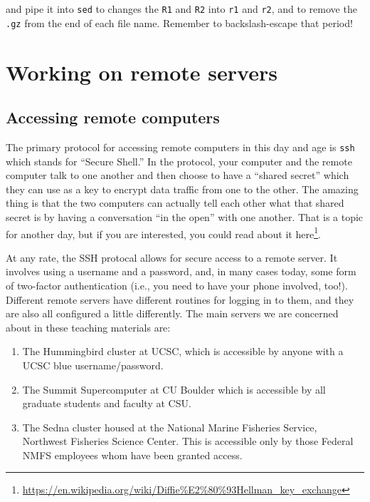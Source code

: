 \documentclass[]{krantz}
\providecommand{\tightlist}{%
  \setlength{\itemsep}{0pt}\setlength{\parskip}{0pt}}
\renewcommand{\href}[2]{#2\footnote{\url{#1}}}
\begin{document}
and pipe it into \texttt{sed} to changes the \texttt{R1} and \texttt{R2} into \texttt{r1} and \texttt{r2},
and to remove the \texttt{.gz} from the end of each file name. Remember to
backslash-escape that period!

\hypertarget{working-on-remote-servers}{%
\chapter{Working on remote servers}\label{working-on-remote-servers}}

\hypertarget{accessing-remote-computers}{%
\section{Accessing remote computers}\label{accessing-remote-computers}}

The primary protocol for accessing remote computers in this day and age
is \texttt{ssh} which stands for ``Secure Shell.'' In the protocol, your computer
and the remote computer talk to one another and then choose to have a ``shared
secret'' which they can use as a key to encrypt data traffic from one to the other.
The amazing thing is that the two computers can actually tell each other what
that shared secret is by having a conversation ``in the open'' with one another.
That is a topic for another day, but if you are interested, you could
read about it \href{https://en.wikipedia.org/wiki/Diffie\%E2\%80\%93Hellman_key_exchange}{here}.

At any rate, the SSH protocal allows for secure access to a remote server. It involves
using a username and a password, and, in many cases today, some form of two-factor
authentication (i.e., you need to have your phone involved, too!). Different
remote servers have different routines for logging in to them, and they are also
all configured a little differently. The main servers we are concerned about in
these teaching materials are:

\begin{enumerate}
\def\labelenumi{\arabic{enumi}.}
\tightlist
\item
  The Hummingbird cluster at UCSC, which is accessible by anyone with a UCSC blue username/password.
\item
  The Summit Supercomputer at CU Boulder which is accessible by all graduate students and
  faculty at CSU.
\item
  The Sedna cluster housed at the National Marine Fisheries Service, Northwest Fisheries Science
  Center. This is accessible only by those Federal NMFS employees whom have been granted access.
\end{enumerate}
\end{document}
